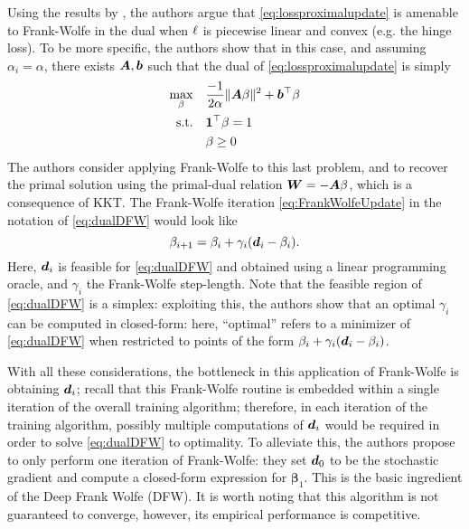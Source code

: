 Using the results by \cite{lacoste2013block}, the authors argue that \eqref{eq:lossproximalupdate} is amenable to Frank-Wolfe in the dual when $\ell$ is piecewise linear and convex (e.g. the hinge loss). To be more specific, the authors show that in this case, and assuming $\alpha_i = \alpha$, there exists ${\bm{A}},{\bm{b}}$ such that the dual of \eqref{eq:lossproximalupdate} is simply
%
\begin{subequations} \label{eq:dualDFW}
\begin{align}
 \max_{\mathbf{\beta}} \quad  &  \frac{-1}{2\alpha} \|{\bm{A}} \mathbf{\beta} \|^2 + {\bm{b}}^\top \mathbf{\beta} \\
 \text{s.t.} \quad & \mathbf{1}^\top \mathbf{\beta} = 1 \\
 & \mathbf{\beta} \geq 0
\end{align}
\end{subequations}
%
The authors consider applying Frank-Wolfe to this last problem, and to recover the primal solution using the primal-dual relation ${\bm{W}} = -{\bm{A}}\mathbf{\beta}$, which is a consequence of KKT. The Frank-Wolfe iteration \eqref{eq:FrankWolfeUpdate} in the notation of \eqref{eq:dualDFW} would look like
\begin{equation}\label{eq:FrankWolfeLP-dual}
\mathbf{\beta}_{i+1} = \mathbf{\beta}_{i} + \gamma_i ({\bm{d}}_i - \mathbf{\beta}_i).
\end{equation}
Here, ${\bm{d}}_i$ is feasible for \eqref{eq:dualDFW} and obtained using a linear programming oracle, and $\gamma_i$ the Frank-Wolfe step-length. Note that the feasible region of \eqref{eq:dualDFW} is a simplex: exploiting this, the authors show that an optimal $\gamma_i$ can be computed in closed-form: here, ``optimal'' refers to a minimizer of \eqref{eq:dualDFW} when restricted to points of the form $\mathbf{\beta}_{i} + \gamma_i ({\bm{d}}_i - \mathbf{\beta}_i)$.

With all these considerations, the bottleneck in this application of Frank-Wolfe is obtaining ${\bm{d}}_i$; recall that this Frank-Wolfe routine is embedded within a single iteration of the overall training algorithm; therefore, in each iteration of the training algorithm, possibly multiple computations of ${\bm{d}}_i$ would be required in order to solve \eqref{eq:dualDFW} to optimality. To alleviate this, the authors propose to only perform one iteration of Frank-Wolfe: they set ${\bm{d}}_0$ to be the stochastic gradient and compute a closed-form expression for $\mathbf{\beta}_{1}$. This is the basic ingredient of the Deep Frank Wolfe (DFW). It is worth noting that this algorithm is not guaranteed to converge, however, its empirical performance is competitive.


